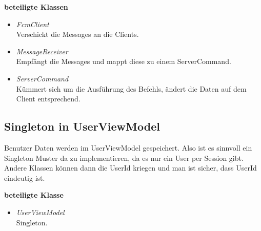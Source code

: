 \documentclass[11pt,a4paper]{article}
\begin{document}
\textbf{beteiligte Klassen}
\begin{itemize}
\item \textit{FcmClient} \\
Verschickt die Messages an die Clients.
\item \textit{MessageReceiver}\\
Empfängt die Messages und mappt diese zu einem ServerCommand.
\item \textit{ServerCommand}\\
Kümmert sich um die Ausführung des Befehls, ändert die Daten auf dem Client entsprechend.
\end{itemize}

\subsection{Singleton in UserViewModel}
Benutzer Daten werden im UserViewModel gespeichert. Also ist es sinnvoll ein Singleton Muster da zu implementieren, da es nur ein User per Session gibt. Andere Klassen können dann die UserId kriegen und man ist sicher, dass UserId eindeutig ist.

\textbf{beteiligte Klasse}
\begin{itemize}
\item \textit{UserViewModel} \\
Singleton.
\end{itemize}



\newpage
\end{document}
